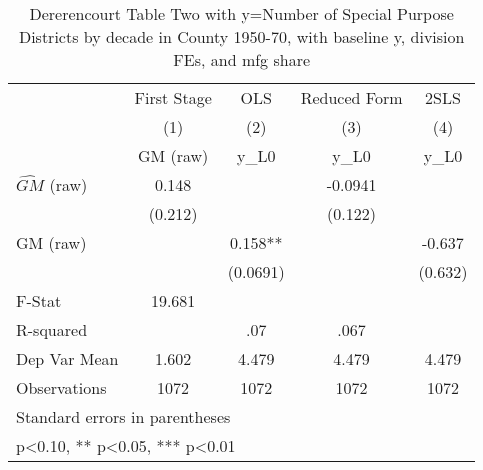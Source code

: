 \begin{table}[htbp]\centering
\def\sym#1{\ifmmode^{#1}\else\(^{#1}\)\fi}
\caption{Dererencourt Table Two with y=Number of Special Purpose Districts by decade in County 1950-70, with baseline y, division FEs, and mfg share}
\begin{tabular}{l*{4}{c}}
\toprule
                    & First Stage   &         OLS   &Reduced Form   &        2SLS   \\
                    &\multicolumn{1}{c}{(1)}&\multicolumn{1}{c}{(2)}&\multicolumn{1}{c}{(3)}&\multicolumn{1}{c}{(4)}\\
                    &\multicolumn{1}{c}{GM  (raw)}&\multicolumn{1}{c}{y\_L0}&\multicolumn{1}{c}{y\_L0}&\multicolumn{1}{c}{y\_L0}\\
\midrule
$\hat{GM}$ (raw)    &       0.148   &               &     -0.0941   &               \\
                    &     (0.212)   &               &     (0.122)   &               \\
\addlinespace
GM  (raw)           &               &       0.158** &               &      -0.637   \\
                    &               &    (0.0691)   &               &     (0.632)   \\
\midrule
F-Stat              &      19.681   &               &               &               \\
R-squared           &               &         .07   &        .067   &               \\
Dep Var Mean        &       1.602   &       4.479   &       4.479   &       4.479   \\
Observations        &        1072   &        1072   &        1072   &        1072   \\
\bottomrule
\multicolumn{5}{l}{\footnotesize Standard errors in parentheses}\\
\multicolumn{5}{l}{\footnotesize * p<0.10, ** p<0.05, *** p<0.01}\\
\end{tabular}
\end{table}
